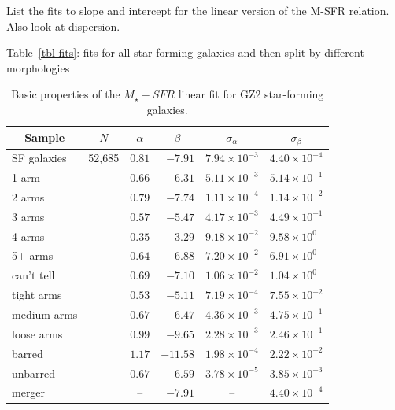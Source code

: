 \documentclass{emulateapj}
\begin{document}
List the fits to slope and intercept for the linear version of the M-SFR relation. Also look at dispersion. 

Table~\ref{tbl-fits}: fits for all star forming galaxies and then split by different morphologies

\begin{table} \caption{Basic properties of the $M_\star-SFR$ linear fit for GZ2 star-forming galaxies.}
 \begin{tabular}{@{}lrcrcl}
 \hline
\multicolumn{1}{c}{Sample} &
\multicolumn{1}{c}{$N$} &
\multicolumn{1}{c}{$\alpha$} &
\multicolumn{1}{c}{$\beta$} &
\multicolumn{1}{c}{$\sigma_\alpha$} &
\multicolumn{1}{c}{$\sigma_\beta$} 
\\ 
\hline
\hline						
SF galaxies  & 52,685  & $0.81$  & $-7.91$   & $7.94\times10^{-3}$   & $4.40\times10^{-4}$  \\
\hline
1 arm        &         & $0.66$  & $-6.31$  &  $5.11\times10^{-3}$  & $5.14\times10^{-1}$  \\
2 arms       &         & $0.79$  & $-7.74$  &  $1.11\times10^{-4}$  & $1.14\times10^{-2}$  \\
3 arms       &         & $0.57$  & $-5.47$  &  $4.17\times10^{-3}$  & $4.49\times10^{-1}$  \\
4 arms       &         & $0.35$  & $-3.29$  &  $9.18\times10^{-2}$  & $9.58\times10^{0 }$  \\
5+ arms      &         & $0.64$  & $-6.88$  &  $7.20\times10^{-2}$  & $6.91\times10^{0 }$  \\
can't tell   &         & $0.69$  & $-7.10$  &  $1.06\times10^{-2}$  & $1.04\times10^{0 }$  \\
\hline
tight arms   &         & $0.53$  & $-5.11$   &  $7.19\times10^{-4}$  & $7.55\times10^{-2}$  \\
medium arms  &         & $0.67$  & $-6.47$   &  $4.36\times10^{-3}$  & $4.75\times10^{-1}$  \\
loose arms   &         & $0.99$  & $-9.65$   &  $2.28\times10^{-3}$  & $2.46\times10^{-1}$  \\
\hline
barred       &         & $1.17$  & $-11.58$  &  $1.98\times10^{-4}$  & $2.22\times10^{-2}$  \\
unbarred     &         & $0.67$  & $ -6.59$  &  $3.78\times10^{-5}$  & $3.85\times10^{-3}$  \\
\hline
merger       &         & --      & $ -7.91$  &  --                   & $4.40\times10^{-4}$  \\
\hline
 \end{tabular}
\end{table}
\end{document}
